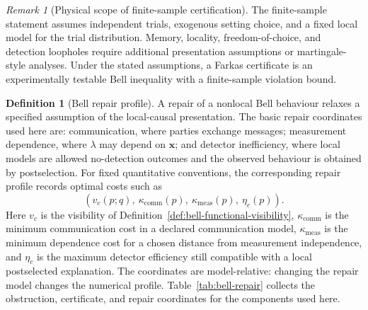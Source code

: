 \documentclass[11pt]{article}
\theoremstyle{plain}
\theoremstyle{definition}
\newtheorem{definition}[theorem]{Definition}
\theoremstyle{remark}
\newtheorem{remark}[theorem]{Remark}
\begin{document}
\begin{remark}[Physical scope of finite-sample certification]
The finite-sample statement assumes independent trials, exogenous setting choice,
and a fixed local model for the trial distribution. Memory, locality,
freedom-of-choice, and detection loopholes require additional presentation
assumptions or martingale-style analyses. Under the stated assumptions, a Farkas
certificate is an experimentally testable Bell inequality with a finite-sample
violation bound.
\end{remark}

\begin{definition}[Bell repair profile]
\label{def:bell-repair-profile}
A repair of a nonlocal Bell behaviour relaxes a specified assumption of the
local-causal presentation. The basic repair coordinates used here are:
communication, where parties exchange messages; measurement dependence, where
\(\lambda\) may depend on \(\mathbf x\); and detector inefficiency, where local
models are allowed no-detection outcomes and the observed behaviour is obtained
by postselection. For fixed quantitative conventions, the corresponding repair
profile records optimal costs such as
\[
(v_c(p;q),\ \kappa_{\mathrm{comm}}(p),\ \kappa_{\mathrm{meas}}(p),\ \eta_c(p)).
\]
Here \(v_c\) is the visibility of Definition~\ref{def:bell-functional-visibility},
\(\kappa_{\mathrm{comm}}\) is the minimum communication cost in a declared
communication model, \(\kappa_{\mathrm{meas}}\) is the minimum dependence cost for
a chosen distance from measurement independence, and \(\eta_c\) is the maximum
detector efficiency still compatible with a local postselected explanation. The
coordinates are model-relative: changing the repair model changes the numerical
profile. Table~\ref{tab:bell-repair} collects the obstruction, certificate, and
repair coordinates for the components used here.
\end{definition}
\end{document}
